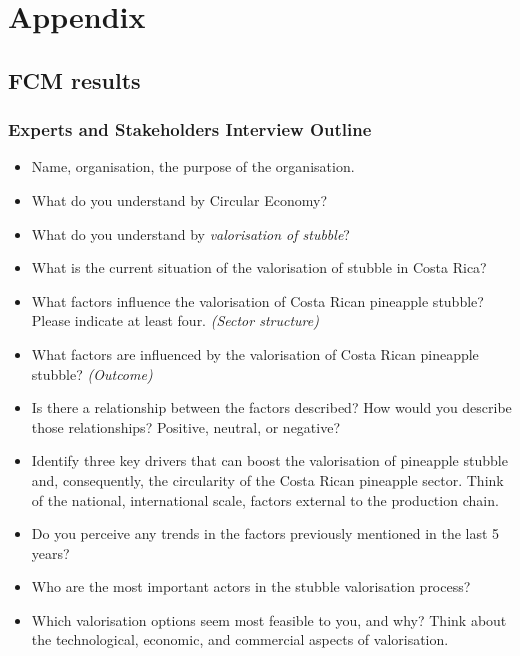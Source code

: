 \chapter{Appendix}

\renewcommand{\thesection}{A\arabic{section}}
\renewcommand\thefigure{A\arabic{section}.\arabic{figure}}  
\renewcommand\thetable{A\arabic{section}.\arabic{table}}  

\section{FCM results}

\subsection{Experts and Stakeholders Interview Outline}
\label{interviewOutline}

\begin{itemize}

\item Name, organisation, the purpose of the organisation.
\item What do you understand by Circular Economy?
\item What do you understand by \textit{valorisation of stubble}?
\item What is the current situation of the valorisation of stubble in Costa Rica?
\item What factors influence the valorisation of Costa Rican pineapple stubble? Please indicate at least four. \textit{(Sector structure)}
\item What factors are influenced by the valorisation of Costa Rican pineapple stubble? \textit{(Outcome)}
\item Is there a relationship between the factors described? How would you describe those relationships? Positive, neutral, or negative?
\item Identify three key drivers that can boost the valorisation of pineapple stubble and, consequently, the circularity of the Costa Rican pineapple sector. Think of the national, international scale, factors external to the production chain.
\item Do you perceive any trends in the factors previously mentioned in the last 5 years?
\item Who are the most important actors in the stubble valorisation process?
\item Which valorisation options seem most feasible to you, and why? Think about the technological, economic, and commercial aspects of valorisation.

\end{itemize}




